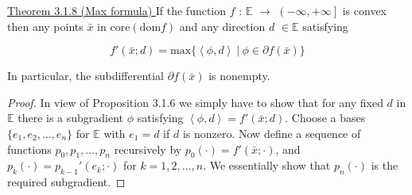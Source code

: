 \documentclass[a4paper,11pt]{jsarticle}
\begin{document}
\begin{itembox}[l]{\underline{Theorem 3.1.8 (Max formula) }}
  If the function $f$ : $\mathbb{E}$ $\to$ $ \left ( -\infty ,+\infty \right ] $ is convex then any points $\bar{x}$ in $\text{core}(\text{dom}f)$ and any direction $d$ $\in \mathbb{E}$ satisfying

  \begin{equation}
    f'(\bar{x};d) = \text{max}\{\left\langle \phi , d\right\rangle \:|\: \phi \in \partial f(\bar{x})\} \tag*{(3.1.9)}
  \end{equation}

  In particular, the subdifferential $\partial f(\bar{x})$ is nonempty.
\end{itembox}

\begin{proof}
  In view of Proposition 3.1.6 we simply have to show that for  any fixed $d$ in $\mathbb{E}$ there is a subgradient $\phi$ satisfying $\left\langle \phi , d\right\rangle = f'(\bar{x};d)$. Choose a bases $\{e_1,e_2,\dots,e_n\}$ for $\mathbb{E}$ with $e_1=d$ if $d$ is nonzero. Now define a sequence of functions $p_0,p_1,\dots,p_n$ recursively by $p_0(\cdot)=f'(\bar{x};\cdot)$, and $p_k(\cdot)=p_{k-1}'(e_k;\cdot)$ for $k=1,2,\dots,n$. We essentially show that $p_n(\cdot)$ is the required subgradient.


\end{proof}
\end{document}
